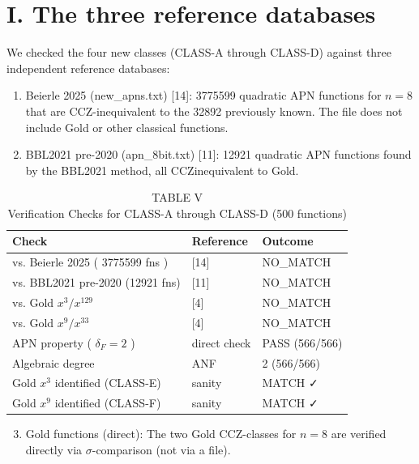 \documentclass[10pt]{article}
\begin{document}
\section*{I. The three reference databases}
We checked the four new classes (CLASS-A through CLASS-D) against three independent reference databases:

\begin{enumerate}
  \item Beierle 2025 (new\_apns.txt) [14]: 3775599 quadratic APN functions for $n=8$ that are CCZ-inequivalent to the 32892 previously known. The file does not include Gold or other classical functions.
  \item BBL2021 pre-2020 (apn\_8bit.txt) [11]: 12921 quadratic APN functions found by the BBL2021 method, all CCZinequivalent to Gold.
\end{enumerate}

\begin{table}[h]
\begin{center}
\captionsetup{labelformat=empty}
\caption{TABLE V\\
Verification Checks for CLASS-A through CLASS-D (500 functions)}
\begin{tabular}{|l|l|l|}
\hline
Check & Reference & Outcome \\
\hline
vs. Beierle 2025 ( 3775599 fns ) & [14] & NO\_MATCH \\
\hline
vs. BBL2021 pre-2020 (12921 fns) & [11] & NO\_MATCH \\
\hline
vs. Gold $x^{3} / x^{129}$ & [4] & NO\_MATCH \\
\hline
vs. Gold $x^{9} / x^{33}$ & [4] & NO\_MATCH \\
\hline
APN property ( $\delta_{F}=2$ ) & direct check & PASS (566/566) \\
\hline
Algebraic degree & ANF & 2 (566/566) \\
\hline
Gold $x^{3}$ identified (CLASS-E) & sanity & MATCH ✓ \\
\hline
Gold $x^{9}$ identified (CLASS-F) & sanity & MATCH ✓ \\
\hline
\end{tabular}
\end{center}
\end{table}

\begin{enumerate}
  \setcounter{enumi}{2}
  \item Gold functions (direct): The two Gold CCZ-classes for $n=8$ are verified directly via $\sigma$-comparison (not via a file).
\end{enumerate}
\end{document}
